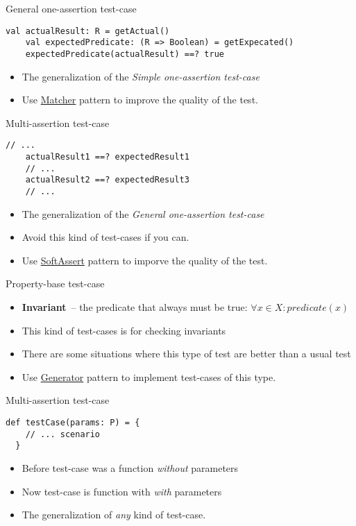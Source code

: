 \documentclass[aspectratio=169]{beamer}
\begin{document}
\begin{frame}[fragile]{General one-assertion test-case}
  \begin{lstlisting}[style=scala]
    val actualResult: R = getActual()
    val expectedPredicate: (R => Boolean) = getExpecated()
    expectedPredicate(actualResult) ==? true 
  \end{lstlisting}
  \begin{itemize}
    \item The generalization of the \textit{Simple one-assertion test-case}
    \item Use \underline{Matcher} pattern to improve the quality of the test.
  \end{itemize}
\end{frame}

\begin{frame}[fragile]{Multi-assertion test-case}
  \begin{lstlisting}[style=scala]
    // ...
    actualResult1 ==? expectedResult1
    // ...
    actualResult2 ==? expectedResult3
    // ...
  \end{lstlisting}
  \begin{itemize}
    \item The generalization of the \textit{General one-assertion test-case}
    \item Avoid this kind of test-cases if you can.
    \item Use \underline{SoftAssert} pattern to imporve the quality of the test.
  \end{itemize}
\end{frame}

\begin{frame}[fragile]{Property-base test-case}
  \begin{itemize}
    \item \textbf{Invariant}~-- the predicate that always must be true: $\forall x \in X: predicate(x)$
    \item This kind of test-cases is for checking invariants
    \item There are some situations where this type of test are better than a usual test
    \item Use \underline{Generator} pattern to implement test-cases of this type.
  \end{itemize}
\end{frame}

\begin{frame}[fragile]{Multi-assertion test-case}
  \begin{lstlisting}[style=scala]
  def testCase(params: P) = {
    // ... scenario
  }
  \end{lstlisting}
  \begin{itemize}
    \item Before test-case was a function \textit{without} parameters
    \item Now test-case is function with \textit{with} parameters
    \item The generalization of \textit{any} kind of test-case.
  \end{itemize}
\end{frame}
\end{document}
